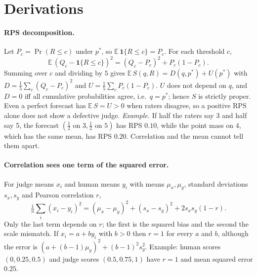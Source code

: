 \section{Derivations}
\label{app:derivations}
\paragraph{RPS decomposition.}
Let $P_c=\Pr(R\le c)$ under $p^*$, so $\mathbb E\,\mathbf 1\{R\le c\}=P_c$. For each threshold $c$,
\[
\mathbb E\,(Q_c-\mathbf 1\{R\le c\})^2=(Q_c-P_c)^2+P_c(1-P_c).
\]
Summing over $c$ and dividing by $5$ gives $\mathbb E\,S(q,R)=D(q,p^*)+U(p^*)$ with $D=\tfrac15\sum_{c}(Q_c-P_c)^2$ and $U=\tfrac15\sum_c P_c(1-P_c)$.
$U$ does not depend on $q$, and $D=0$ iff all cumulative probabilities agree, i.e.\ $q=p^*$; hence $S$ is strictly proper.
Even a perfect forecast has $\mathbb E\,S=U>0$ when raters disagree, so a positive RPS alone does not show a defective judge.
\emph{Example.} If half the raters say 3 and half say 5, the forecast $(\tfrac12\text{ on }3,\tfrac12\text{ on }5)$ has RPS $0.10$, while the point mass on $4$, which has the same mean, has RPS $0.20$. Correlation and the mean cannot tell them apart.

\paragraph{Correlation sees one term of the squared error.}
For judge means $x_i$ and human means $y_i$ with means $\mu_x,\mu_y$, standard deviations $s_x,s_y$ and Pearson correlation $r$,
\[
\tfrac1n\textstyle\sum_i (x_i-y_i)^2=(\mu_x-\mu_y)^2+(s_x-s_y)^2+2s_xs_y(1-r).
\]
Only the last term depends on $r$; the first is the squared bias and the second the scale mismatch.
If $x_i=a+by_i$ with $b>0$ then $r=1$ for every $a$ and $b$, although the error is $(a+(b-1)\mu_y)^2+(b-1)^2s_y^2$.
Example: human scores $(0,0.25,0.5)$ and judge scores $(0.5,0.75,1)$ have $r=1$ and mean squared error $0.25$.

